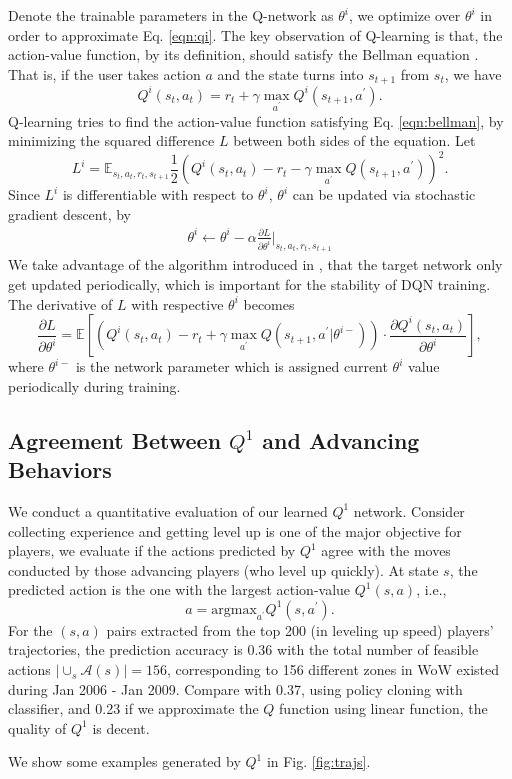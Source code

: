 \documentclass[a4paper]{article}
\begin{document}
Denote the trainable parameters in the Q-network as $\theta^i$, we optimize over $\theta^i$ in order to approximate Eq. \eqref{eqn:qi}. The key observation of Q-learning is that, the action-value function, by its definition, should satisfy the Bellman equation \cite{}. That is, if the user takes action $a$ and the state turns into $s_{t+1}$ from $s_t$, we have
\begin{equation}
Q^i(s_t,a_t)=r_{t} + \gamma \max_{a^\prime}Q^i(s_{t+1}, a^\prime). \label{eqn:bellman}
\end{equation}
Q-learning tries to find the action-value function satisfying Eq. \eqref{eqn:bellman}, by minimizing the squared difference $L$ between both sides of the equation. Let
\begin{equation*}
L^i=\mathbb{E}_{s_t, a_t, r_t, s_{t+1}} \frac{1}{2}(Q^i(s_t,a_t)- r_{t} - \gamma\max_{a^\prime}Q(s_{t+1}, a^\prime))^2.
\end{equation*}
Since $L^i$ is differentiable with respect to $\theta^i$, $\theta^i$ can be updated via stochastic gradient descent, by
\begin{eqnarray*}
\theta^i \leftarrow \theta^i - \alpha\frac{\partial L}{\partial \theta^i}\Big|_{s_t, a_t, r_t, s_{t+1}}
\end{eqnarray*}
We take advantage of the algorithm introduced in \cite{}, that the target network only get updated periodically, which is important for the stability of DQN training. The derivative of $L$ with respective $\theta^i$ becomes
$$\frac{\partial L}{\partial \theta^i} = \mathbb{E}\left[ (Q^i(s_t,a_t)- r_{t} + \gamma\max_{a^\prime}Q(s_{t+1}, a^\prime | \theta^{i -}))\cdot \frac{\partial{Q^i(s_t,a_t)}}{\partial{\theta^i}}\right],$$
where $\theta^{i-}$ is the network parameter which is assigned current $\theta^i$ value periodically during training.

\subsection{Agreement Between $Q^1$ and Advancing Behaviors}

We conduct a quantitative evaluation of our learned $Q^1$ network. Consider collecting experience and getting level up is one of the major objective for players, we evaluate if the actions predicted by $Q^1$ agree with the moves conducted by those advancing players (who level up quickly). At state $s$, the predicted action is the one with the largest action-value $Q^1(s,a)$, i.e.,
\begin{equation*}
a = \text{argmax}_{a^\prime}Q^1(s,a^\prime).
\end{equation*}
For the $(s,a)$ pairs extracted from the top 200 (in leveling up speed) players' trajectories, the prediction accuracy is 0.36 with the total number of feasible actions $|\cup_s\mathcal{A}(s)|=156$, corresponding to 156 different zones in WoW existed during Jan 2006 - Jan 2009. Compare with 0.37, using policy cloning with classifier, and 0.23 if we approximate the $Q$ function using linear function, the quality of $Q^1$ is decent.

We show some examples generated by $Q^1$ in Fig. \ref{fig:trajs}.
\end{document}
